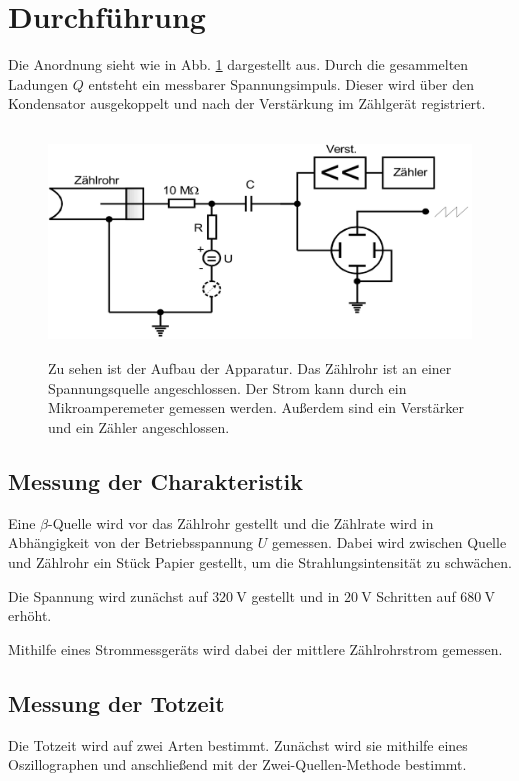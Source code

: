 \section{Durchführung}
\label{sec:Durchführung}

Die Anordnung sieht wie in Abb. \ref{fig:aufbau} dargestellt aus. Durch die gesammelten Ladungen $Q$ entsteht ein messbarer Spannungsimpuls. Dieser wird über den Kondensator ausgekoppelt und nach der Verstärkung im Zählgerät registriert.

\begin{figure}
    \centering
    \includegraphics[width=12cm, height=6cm]{build/aufbau.png}
    \caption{Zu sehen ist der Aufbau der Apparatur. Das Zählrohr ist an einer Spannungsquelle angeschlossen. Der Strom kann durch ein Mikroamperemeter gemessen werden. Außerdem sind ein Verstärker und ein Zähler angeschlossen. \cite{V703}}
    \label{fig:aufbau}
\end{figure}

\subsection{Messung der Charakteristik}
Eine $\beta$-Quelle wird vor das Zählrohr gestellt und die Zählrate wird in Abhängigkeit von der Betriebsspannung $U$ gemessen. Dabei wird zwischen Quelle und Zählrohr ein Stück Papier gestellt, um die Strahlungsintensität zu schwächen.

\noindent Die Spannung wird zunächst auf $\SI{320}{\volt}$ gestellt und in $\SI{20}{\volt}$ Schritten auf $\SI{680}{\volt}$ erhöht.

\noindent Mithilfe eines Strommessgeräts wird dabei der mittlere Zählrohrstrom gemessen.


\subsection{Messung der Totzeit}
Die Totzeit wird auf zwei Arten bestimmt. Zunächst wird sie mithilfe eines Oszillographen und anschließend mit der Zwei-Quellen-Methode bestimmt.

